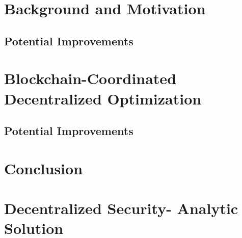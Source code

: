\documentclass[oldfontcommands]{ucbthesis}
\begin{document}
\chapter{Background and Motivation}\label{chap:background}

\makeatletter
{}
\def\Ginput@path{{chapters/background/}}
\makeatother

\section{Potential Improvements}



\chapter{Blockchain-Coordinated Decentralized Optimization}\label{chap:blockchains}

\makeatletter
{}
\def\Ginput@path{{chapters/blockchains/}}
\makeatother

\section{Potential Improvements}



\chapter{Conclusion}\label{chap:conclusion}







\appendix

\chapter{Decentralized Security- Analytic Solution}
\makeatletter
{}
\def\Ginput@path{{chapters/blockchains/}}
\makeatother


\end{document}
